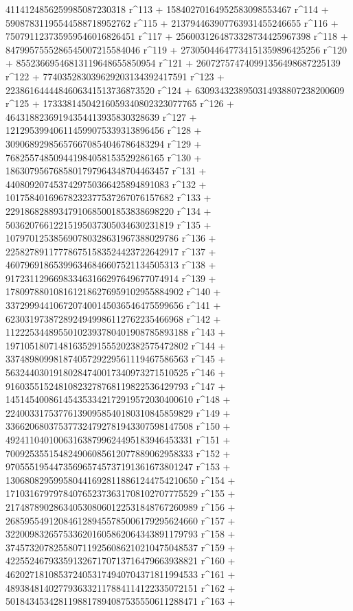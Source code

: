        4114124856259985087230318 r^113 + 
       15840270164952583098553467 r^114 + 
       59087831195544588718952762 r^115 + 
       213794463907763931455246655 r^116 + 
       750791123735959546016826451 r^117 + 
       2560031264873328734425967398 r^118 + 
       8479957555286545007215584046 r^119 + 
       27305044647734151359896425256 r^120 + 
       85523669546813119648655850954 r^121 + 
       260727574740991356498687225139 r^122 + 
       774035283039629203134392417591 r^123 + 
       2238616444484606341513736873520 r^124 + 
       6309343238950314938807238200609 r^125 + 
       17333814504216059340802323077765 r^126 + 
       46431882369194354413935830328639 r^127 + 
       121295399406114599075339313896456 r^128 + 
       309068929856576670854046786483294 r^129 + 
       768255748509441984058153529286165 r^130 + 
       1863079567685801797964348704463457 r^131 + 
       4408092074537429750366425894891083 r^132 + 
       10175840169678232377537267076157682 r^133 + 
       22918682889347910685001853838698220 r^134 + 
       50362076612215195037305034630231819 r^135 + 
       107970125385690780328631967388029786 r^136 + 
       225827891177786751583524423722642917 r^137 + 
       460796918653996346846607521134505313 r^138 + 
       917231129669833463166297649677074914 r^139 + 
       1780978801081612186276959102955884902 r^140 + 
       3372999441067207400145036546475599656 r^141 + 
       6230319738728924949986112762235466968 r^142 + 
       11222534489550102393780401908785893188 r^143 + 
       19710518071481635291555202382575472802 r^144 + 
       33748980998187405729229561119467586563 r^145 + 
       56324403019180284740017340973271510525 r^146 + 
       91603551524810823278768119822536429793 r^147 + 
       145145400861454353342172919572030400610 r^148 + 
       224003317537761390958540180310845859829 r^149 + 
       336620680375377324792781943307598147508 r^150 + 
       492411040100631638799624495183946453331 r^151 + 
       700925355154824906085612077889062958333 r^152 + 
       970555195447356965745737191361673801247 r^153 + 
       1306808295995804416928118861244754210650 r^154 + 
       1710316797978407652373631708102707775529 r^155 + 
       2174878902863405308060122531848767260989 r^156 + 
       2685955491208461289455785006179295624660 r^157 + 
       3220098326575336201605862064343891179793 r^158 + 
       3745732078255807119256086210210475048537 r^159 + 
       4225524679335913267170713716479663938821 r^160 + 
       4620271810853724053174940704371811994533 r^161 + 
       4893848140277936332117884114122335072151 r^162 + 
       5018434534281198817894087535550611288471 r^163 + 
